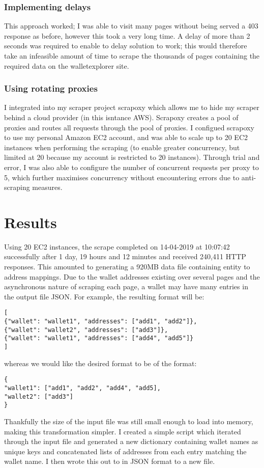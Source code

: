 \subsubsection{Implementing delays} 
This approach worked; I was able to visit many pages without being served a 403 response as before, however this took a very long time. A delay of more than 2 seconds was required to enable to delay solution to work; this would therefore take an infeasible amount of time to scrape the thousands of pages containing the required data on the walletexplorer site. 

\subsubsection{Using rotating proxies}
I integrated into my scraper project scrapoxy which allows me to hide my scraper behind a cloud provider (in this isntance AWS). Scrapoxy creates a pool of proxies and routes all requests through the pool of proxies. I configued scrapoxy to use my personal Amazon EC2 account, and was able to scale up to 20 EC2 instances when performing the scraping (to enable greater concurrency, but limited at 20 because my account is restricted to 20 instances).  Through trial and error, I was also able to configure the number of concurrent requests per proxy to 5, which further maximises concurrency without encountering errors due to anti-scraping measures. 

\section{Results}
Using 20 EC2 instances, the scrape completed on 14-04-2019 at 10:07:42 successfully after 1 day, 19 hours and 12 minutes and received 240,411 HTTP responses. This amounted to generating a 920MB data file containing entity to address mappings. Due to the wallet addresses existing over several pages and the asynchronous nature of scraping each page, a wallet may have many entries in the output file JSON. For example, the resulting format will be:

\begin{lstlisting}
[
{"wallet": "wallet1", "addresses": ["add1", "add2"]},
{"wallet": "wallet2", "addresses": ["add3"]},
{"wallet": "wallet1", "addresses": ["add4", "add5"]}
]
\end{lstlisting}

whereas we would like the desired format to be of the format:

\begin{lstlisting}
{
"wallet1": ["add1", "add2", "add4", "add5],
"wallet2": ["add3"]
}
\end{lstlisting}
Thankfully the size of the input file was still small enough to load into memory, making this transformation simpler. I created a simple script which iterated through the input file and generated a new dictionary containing wallet names as unique keys and concatenated lists of addresses from each entry matching the wallet name. I then wrote this out to in JSON format to a new file. 


